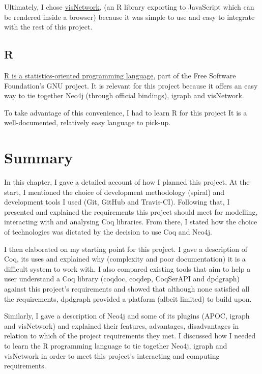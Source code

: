Ultimately, I chose
\href{http://datastorm-open.github.io/visNetwork}{visNetwork}, (an R library
exporting to JavaScript which can be rendered inside a browser) because it was
simple to use and easy to integrate with the rest of this project.

\subsection{R}\label{subsec:R}

\href{http://www.r-project.org}{R is a statistics-oriented programming
language}, part of the Free Software Foundation's GNU project. It is relevant for
this project because it offers an easy way to tie together Neo4j (through
official bindings), igraph and visNetwork.

To take advantage of this convenience, I had to learn R for this project It is a
well-documented, relatively easy language to pick-up.

\newpage
\section{Summary}

In this chapter, I gave a detailed account of how I planned this project. At the
start, I mentioned the choice of development methodology (spiral) and
development tools I used (Git, GitHub and Travis-CI). Following that, I
presented and explained the requirements this project should meet for modelling,
interacting with and analysing Coq libraries. From there, I stated how the
choice of technologies was dictated by the decision to use Coq and Neo4j.

I then elaborated on my starting point for this project. I gave a description of
Coq, its uses and explained why (complexity and poor documentation) it is a
difficult system to work with. I also compared existing tools that aim to help a
user understand a Coq library (coqdoc, coqdep, CoqSerAPI and dpdgraph) against
this project's requirements and showed that although none satisfied all the
requirements, dpdgraph provided a platform (albeit limited) to build upon.

Similarly, I gave a description of Neo4j and some of its plugins (APOC, igraph
and visNetwork) and explained their features, advantages, disadvantages in
relation to which of the project requirements they met. I discussed how I needed
to learn the R programming language to tie together Neo4j, igraph and visNetwork
in order to meet this project's interacting and computing requirements.
